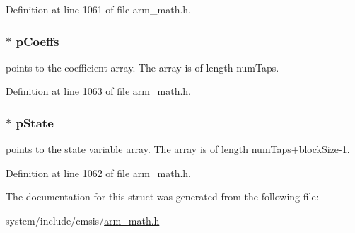 Definition at line 1061 of file arm\+\_\+math.\+h.

\subsubsection[{\texorpdfstring{p\+Coeffs}{pCoeffs}}]{$\ast$ p\+Coeffs}\hypertarget{structarm__fir__instance__f32_aacbb8dd8eeba4b21fc2bb40076405ee3}{}\label{structarm__fir__instance__f32_aacbb8dd8eeba4b21fc2bb40076405ee3}
points to the coefficient array. The array is of length num\+Taps. 

Definition at line 1063 of file arm\+\_\+math.\+h.

\subsubsection[{\texorpdfstring{p\+State}{pState}}]{$\ast$ p\+State}\hypertarget{structarm__fir__instance__f32_a335c87e6fdc4b96601d95a5de8b9c463}{}\label{structarm__fir__instance__f32_a335c87e6fdc4b96601d95a5de8b9c463}
points to the state variable array. The array is of length num\+Taps+block\+Size-\/1. 

Definition at line 1062 of file arm\+\_\+math.\+h.



The documentation for this struct was generated from the following file\+:\begin{DoxyCompactItemize}
\item 
system/include/cmsis/\hyperlink{arm__math_8h}{arm\+\_\+math.\+h}\end{DoxyCompactItemize}
